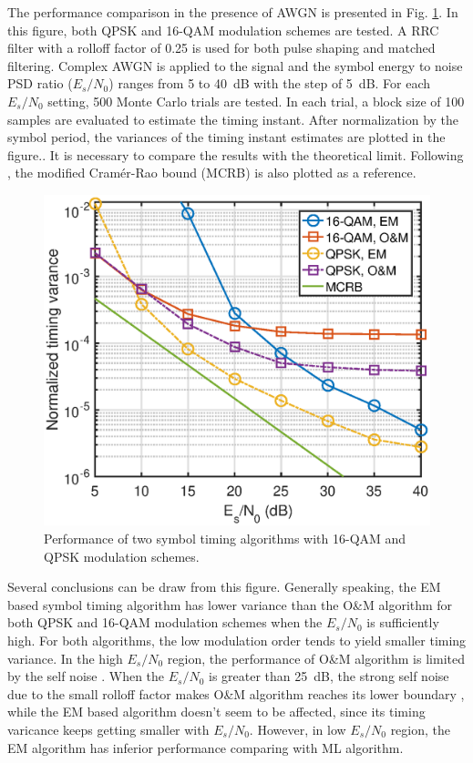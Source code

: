 \documentclass[journal,comsoc]{IEEEtran}
\begin{document}
The performance comparison in the presence of AWGN is presented in Fig. \ref{fig:timing_per}.
In this figure, both QPSK and 16-QAM modulation schemes are tested.
A RRC filter with a rolloff factor of 0.25 is used for both pulse shaping and matched filtering.
Complex AWGN is applied to the signal and the symbol energy to noise PSD ratio (\(E_s/N_0\)) ranges from 5 to 40~dB with the step of 5~dB.
For each \(E_s/N_0\) setting, 500 Monte Carlo trials are tested.
In each trial, a block size of 100 samples are evaluated to estimate the timing instant.
After normalization by the symbol period, the variances of the timing instant estimates are plotted in the figure..
It is necessary to compare the results with the theoretical limit.
Following \cite{mengali1997synchronization}, the modified Cram\'er-Rao bound (MCRB) is also plotted as a reference.

\begin{figure}[ht]
\centering
\includegraphics[width=3 in]{pic/per_timing.eps}
\caption{Performance of two symbol timing algorithms with 16-QAM and QPSK modulation schemes.}
\label{fig:timing_per} 
\end{figure}   

Several conclusions can be draw from this figure.
Generally speaking, the EM based symbol timing algorithm has lower variance than the O\&M algorithm for both QPSK and 16-QAM modulation schemes when the  \(E_s/N_0\) is sufficiently high.
For both algorithms, the low modulation order tends to yield smaller timing variance.
In the high \(E_s/N_0\) region, the performance of O\&M algorithm is limited by the self noise . 
When the \(E_s/N_0\) is greater than 25~dB, the strong self noise due to the small rolloff factor makes O\&M algorithm reaches its lower boundary , while the EM based algorithm doesn't seem to be affected, since  its timing varicance keeps getting smaller with  \(E_s/N_0\).
However, in low \(E_s/N_0\) region, the EM algorithm has inferior performance comparing with ML algorithm.
\end{document}
